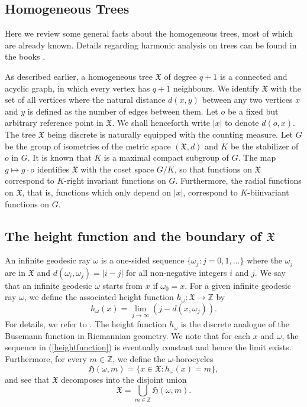 \documentclass[12pt,reqno]{amsart}
\newcommand{\Z}{\mathbb Z}%
\theoremstyle{definition}
\theoremstyle{definition}
\numberwithin{equation}{section}
\begin{document}
\subsection{Homogeneous Trees}
Here we review some general facts about the homogeneous trees, most of which are already known. Details regarding harmonic analysis on trees can be found in the books \cite{Alessandro_Nebbia,Talamanca_Alessandro_1982}.

As described earlier, a homogeneous tree $\mathfrak{X}$ of degree $q+1$ is a connected and acyclic graph, in which every vertex has $q+1$ neighbours. We identify $\mathfrak{X}$ with the set of all vertices where the natural distance $d(x, y)$ between any two vertices $x$ and $y$ is defined as the number of edges between them. Let $o$ be a fixed but arbitrary reference point in $\mathfrak{X}$. We shall henceforth write $|x|$ to denote $d(o,x)$. The tree $\mathfrak{X}$ being discrete is naturally equipped with the counting measure. Let $G$ be the group of isometries of the metric space $(\mathfrak{X}, d)$ and $K$ be the stabilizer of $o$ in $G$. It is known that $K$ is a maximal compact subgroup of $G$. The map $ g\mapsto g\cdot o$ identifies $\mathfrak{X}$ with the coset space $G/K$, so that functions on $\mathfrak{X}$ correspond to $K$-right invariant functions on $G$. Furthermore, the radial functions on $\mathfrak{X}$, that is, functions which only depend on $|x|$, correspond to $K$-biinvariant functions on $G$.

\subsection{The height function and the boundary of \texorpdfstring{$\mathfrak{X}$}{X}}
An infinite geodesic ray $\omega$ is a one-sided sequence $\{\omega_{j}:j=0,1,\ldots\}$ where the $\omega_{j}$ are in $\mathfrak{X}$ and $d(\omega_i, \omega_j)=|i-j|$ for all non-negative integers $i$ and $j$. We say that an infinite geodesic $\omega$ starts from $x$ if $\omega_{0}=x$. For a given infinite geodesic ray $\omega$, we define the associated height function $ h_\omega :\mathfrak{X} \rightarrow\Z$  by
\begin{equation}\label{heightfunction}
h_\omega(x)=\lim\limits_{j \rightarrow \infty}\left(  j- d(x, \omega_j)\right).
\end{equation}
For details, we refer to \cite{Cowling_Meda_98}. The height function $h_{\omega}$ is the discrete analogue of the Busemann function in Riemannian geometry. We note that for each $x$ and $\omega$, the sequence in (\ref{heightfunction}) is eventually constant and hence the limit exists. Furthermore, for every $m \in \Z$, we define the $\omega$-horocycles
\begin{equation}\label{horocycle}
\mathfrak{H}(\omega,m) =\{ x \in \mathfrak{X} :  h_{\omega}(x)= m \},
\end{equation}
and see that $\mathfrak{X}$ decomposes into the disjoint union
\begin{equation}\label{horocycledecomposition}
\mathfrak{X}=\bigcup\limits_{m\in\mathbb{Z}}\mathfrak{H}(\omega,m) .
\end{equation}
\end{document}
